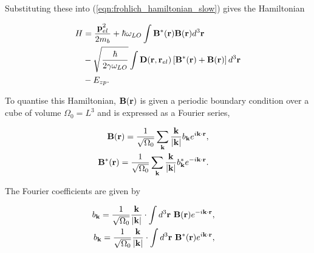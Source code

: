 Substituting these into (\ref{eqn:frohlich_hamiltonian_slow}) gives the Hamiltonian

\begin{equation}
\begin{aligned}
    H &= \frac{\vb{p}^2_{el}}{2m_b} + \hbar \omega_{LO} \int \vb{B}^*(\vb{r}) \vb{B}(\vb{r}) d^3\vb{r} \\
    &- \sqrt{\frac{\hbar}{2\gamma\omega_{LO}}} \int \vb{D}(\vb{r}, \vb{r}_{el}) \left[ \vb{B}^*(\vb{r}) + \vb{B}(\vb{r}) \right] d^3 \vb{r} \\
    &- E_{zp}.
\end{aligned}
\end{equation}

To quantise this Hamiltonian, $\vb{B}(\vb{r})$ is given a periodic boundary condition over a cube of volume $\Omega_0 = L^3$ and is expressed as a Fourier series,

\begin{subequations}
\begin{align}
    \begin{split}
        \vb{B}(\vb{r}) &= \frac{1}{\sqrt{\Omega_0}} \sum_{\vb{k}} \frac{\vb{k}}{\abs{\vb{k}}} b_{\vb{k}} e^{i \vb{k} \cdot \vb{r}},
    \end{split}\\
    \begin{split}
        \vb{B}^*(\vb{r}) &= \frac{1}{\sqrt{\Omega_0}} \sum_{\vb{k}} \frac{\vb{k}}{\abs{\vb{k}}} b^*_{\vb{k}} e^{-i \vb{k} \cdot \vb{r}}.
    \end{split}
\end{align}
\end{subequations}

The Fourier coefficients are given by

\begin{subequations}
\begin{align}
    \begin{split}
        b_{\vb{k}} &= \frac{1}{\sqrt{\Omega_0}} \frac{\vb{k}}{\abs{\vb{k}}} \cdot \int d^3\vb{r}\  \vb{B}(\vb{r}) e^{-i \vb{k} \cdot \vb{r}},
    \end{split}\\
    \begin{split}
        b_{\vb{k}} &= \frac{1}{\sqrt{\Omega_0}} \frac{\vb{k}}{\abs{\vb{k}}} \cdot \int d^3\vb{r}\  \vb{B}^*(\vb{r}) e^{i \vb{k} \cdot \vb{r}},
    \end{split}
\end{align}
\end{subequations}

